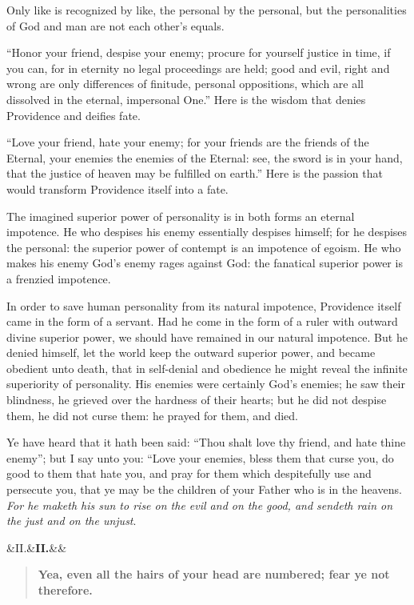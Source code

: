 \documentclass[12pt,a4paper,openany]{book}
\newcommand{\opage}[1]{\marginnote{\footnotesize\textit{[#1]}}}
\newcommand{\stykke}[2]{\begin{center}\ifx&#1&\textbf{#2}\else\textbf{#1}\ifx&#2&\else\\[0.2em]\textbf{#2}\fi\fi\end{center}}
\newcommand{\motto}[1]{\begin{quote}\textbf{#1}\end{quote}}
\begin{document}
Only like is recognized by like, the
personal by the personal, but the personalities of God and
\setcounter{footnote}{0}%
\opage{28}man are not each other's
equals.

``Honor your friend, despise your enemy; procure for yourself
justice in time, if you can, for in eternity no
legal proceedings are held; good and evil, right
and wrong are only differences of finitude, personal
oppositions, which are all dissolved in the
eternal, impersonal One.'' Here is the wisdom
that denies Providence and deifies fate.

``Love your friend, hate your enemy; for your
friends are the friends of the Eternal, your enemies
the enemies of the Eternal: see, the sword is in your
hand, that the justice of heaven may be fulfilled
on earth.'' Here is the passion
that would transform Providence itself into a
fate.

The imagined superior power of personality is in
both forms an eternal impotence. He who despises
his enemy essentially despises himself;
for he despises the personal: the superior power
of contempt is an impotence of egoism. He
who makes his enemy God's enemy rages
against God: the fanatical superior power is a frenzied
impotence.

In order to save human personality
\setcounter{footnote}{0}%
\opage{29}from its natural impotence, Providence itself came in
the form of a servant. Had he come in the form
of a ruler with outward divine
superior power, we should have remained in our natural
impotence. But he denied himself, let the
world keep the outward superior power, and
became obedient unto death, that in self-denial
and obedience he might reveal the infinite
superiority of personality. His enemies
were certainly God's enemies; he saw their
blindness, he grieved over the hardness of their
hearts; but he did not despise them, he  %
did not curse them: he prayed for them, and
died.

Ye have heard that it hath been said: ``Thou shalt
love thy friend, and hate thine enemy'';
but I say unto you: ``Love your enemies,
bless them that curse you,
do good to them that hate you,
and pray for them which despitefully use and persecute you, that ye may be
the children of your Father who is in the heavens.
\emph{For he maketh his sun to rise on the
evil and on the good, and sendeth rain on the
just and on the unjust}.

\setcounter{footnote}{0}%
\opage{30}\stykke{II.}{}
\motto{Yea, even all the hairs of your head are numbered; fear ye
not therefore.}
\end{document}
